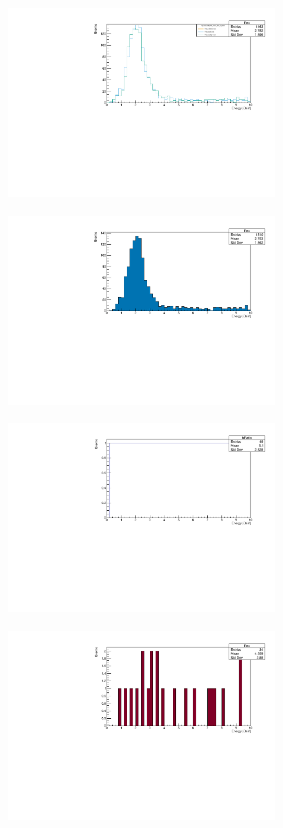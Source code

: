 \documentclass[12pt]{article}
\begin{document}
\begin{figure}[h]
\begin{subfigure}{0.49\textwidth}
   \caption{}
   \label{}
  \end{subfigure}
  \begin{subfigure}{0.49\textwidth}
   \centering
   \includegraphics[width=0.95\linewidth,height=5cm]{./figures/validgenie_numu_Enu_layered.pdf}
   \caption{}
   \label{}
  \end{subfigure}
  \begin{subfigure}{0.49\textwidth}
   \centering
   \includegraphics[width=0.95\linewidth,height=5cm]{./figures/validgenie~numu~Enu-Files~prod5-root.pdf}
   \caption{}
   \label{}
  \end{subfigure}
  \begin{subfigure}{0.49\textwidth}
   \centering
   \includegraphics[width=0.95\linewidth,height=5cm]{./figures/validgenie_numu_Enu_ratio.pdf}
   \caption{}
   \label{}
  \end{subfigure}
  \begin{subfigure}{0.49\textwidth}
   \centering
   \includegraphics[width=0.95\linewidth,height=5cm]{./figures/validgenie~nue~Enu-Files~prod5-root.pdf}
   \caption{}
   \label{}
  \end{subfigure}
\end{figure}
\end{document}
